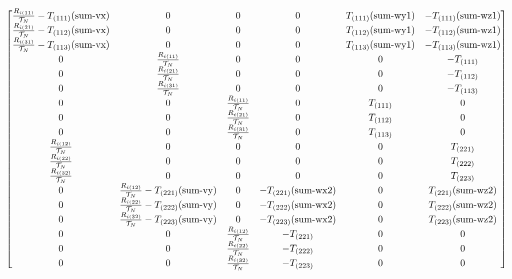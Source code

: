 \begin{landscape}
\begin{equation}
\begin{gathered}
  \scalemath{0.75}{
  \begin{bmatrix}
    \frac{R_{i(11)}}{\mathcal{T}_{N}} -T_{(111)}(\text{sum-vx}) & 0 & 0 & 0 & T_{(111)}(\text{sum-wy1}) & - T_{(111)}(\text{sum-wz1})\\
    \frac{R_{i(21)}}{\mathcal{T}_{N}} -T_{(112)}(\text{sum-vx}) & 0 & 0 & 0 & T_{(112)}(\text{sum-wy1}) & - T_{(112)}(\text{sum-wz1})\\
    \frac{R_{i(31)}}{\mathcal{T}_{N}} -T_{(113)}(\text{sum-vx}) & 0 & 0 & 0 & T_{(113)}(\text{sum-wy1}) & - T_{(113)}(\text{sum-wz1})\\

    0 & \frac{R_{i(11)}}{\mathcal{T}_{N}} & 0 & 0 & 0 & - T_{(111)}\\
    0 & \frac{R_{i(21)}}{\mathcal{T}_{N}} & 0 & 0 & 0 & - T_{(112)}\\
    0 & \frac{R_{i(31)}}{\mathcal{T}_{N}} & 0 & 0 & 0 & - T_{(113)}\\

    0 & 0 & \frac{R_{i(11)}}{\mathcal{T}_{N}} & 0 & T_{(111)} & 0 \\
    0 & 0 & \frac{R_{i(21)}}{\mathcal{T}_{N}} & 0 & T_{(112)} & 0 \\
    0 & 0 & \frac{R_{i(31)}}{\mathcal{T}_{N}} & 0 & T_{(113)} & 0 \\


    \frac{R_{i(12)}}{\mathcal{T}_{N}} & 0 & 0 & 0 & 0 & T_{(221)}\\
    \frac{R_{i(22)}}{\mathcal{T}_{N}} & 0 & 0 & 0 & 0 & T_{(222)}\\
    \frac{R_{i(32)}}{\mathcal{T}_{N}} & 0 & 0 & 0 & 0 & T_{(223)}\\

    0 & \frac{R_{i(12)}}{\mathcal{T}_{N}} -T_{(221)}(\text{sum-vy}) & 0 & - T_{(221)}(\text{sum-wx2})& 0 & T_{(221)}(\text{sum-wz2})\\
    0 & \frac{R_{i(22)}}{\mathcal{T}_{N}} -T_{(222)}(\text{sum-vy}) & 0 & - T_{(222)}(\text{sum-wx2})& 0 & T_{(222)}(\text{sum-wz2})\\
    0 & \frac{R_{i(32)}}{\mathcal{T}_{N}} -T_{(223)}(\text{sum-vy}) & 0 & - T_{(223)}(\text{sum-wx2})& 0 & T_{(223)}(\text{sum-wz2})\\

    0 & 0 & \frac{R_{i(12)}}{\mathcal{T}_{N}} & - T_{(221)} & 0 & 0 \\
    0 & 0 & \frac{R_{i(22)}}{\mathcal{T}_{N}} & - T_{(222)} & 0 & 0 \\
    0 & 0 & \frac{R_{i(32)}}{\mathcal{T}_{N}} & - T_{(223)} & 0 & 0 \\



\end{bmatrix}}
\end{gathered}
\end{equation}
\end{landscape}
